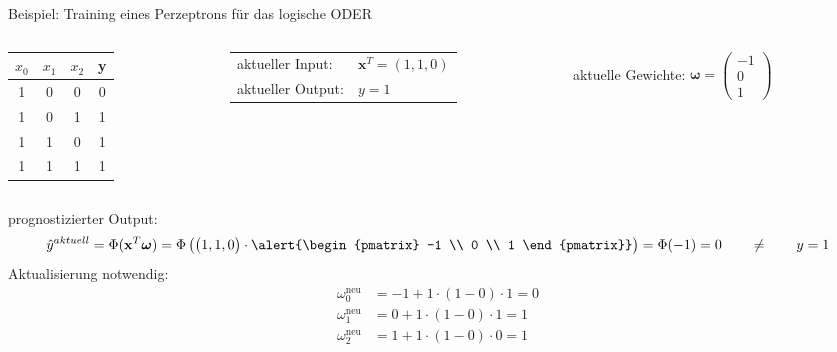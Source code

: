 \documentclass[11pt, aspectratio=169, t]{beamer}
\begin{document}
\begin{frame}{Beispiel: Training eines Perzeptrons für das logische ODER}
\begin{small}
\begin{columns}
\begin{column}{0.25\textwidth}
\hspace{0.5cm}
\begin{footnotesize}
\begin{tabular}{cccc} \toprule
$x_0$ & $x_1$ & $x_2$ & y \\ \midrule
1 & 0 & 0 & 0 \\
1 & 0 & 1 & 1 \\
1 & 1 & 0 & 1 \\
1 & 1 & 1 & 1 \\ \bottomrule
\end{tabular} \end{footnotesize}
\end{column}
\begin{column}{0.4\textwidth}
\begin{tabular}{ll}
aktueller Input: & $\mathbf{x}^{T} = (1, 1, 0)$ \\
aktueller Output: & $y=1$ \\
\end{tabular}
\end{column}
\begin{column}{0.4\textwidth}
aktuelle Gewichte: \alert{ $\boldsymbol{\omega} = \begin{pmatrix} -1 \\ 0 \\ 1 \end{pmatrix}$ }
\end{column}
\end{columns}
prognostizierter Output:
\[\hat{y}^{aktuell} = \Phi(\mathbf{x}^{T}\boldsymbol{\omega}) = \Phi\left( \begin{pmatrix} 1, 1, 0 \end{pmatrix}\cdot \alert{\begin{pmatrix} -1 \\ 0 \\ 1 \end{pmatrix}} \right) = \Phi(-1) = 0 \qquad \neq \qquad y = 1\]
Aktualisierung notwendig:
\begin{align*}
\omega_0^{\text{neu}} &= -1 + 1\cdot (1-0)\cdot 1 = 0 \\
\omega_1^{\text{neu}} &=  0 + 1\cdot (1-0)\cdot 1 = 1 \\
\omega_2^{\text{neu}} &=  1 + 1\cdot (1-0)\cdot 0 = 1
\end{align*}
\end{small}
\end{frame}
\end{document}

